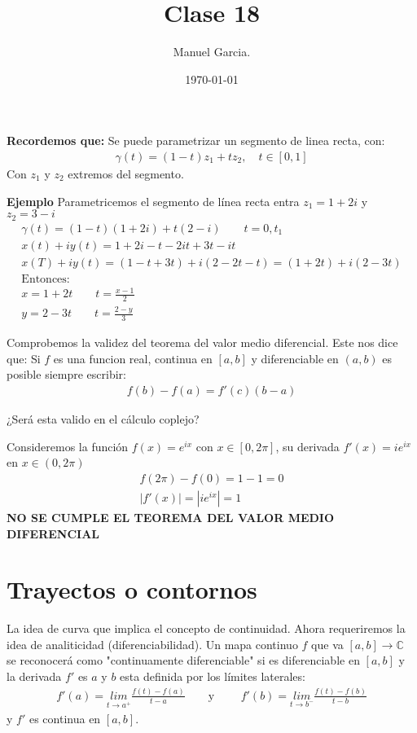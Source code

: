 \documentclass{article}
\title{Clase 18 }
\author{Manuel Garcia.}
\date{\today}
\begin{document}
\maketitle

\section{}
\textbf{Recordemos que: }Se puede parametrizar un segmento de linea recta, con: 
\begin{gather*}
  \gamma(t) = (1-t)z_1 + tz_2, \quad t \in [0,1] 
\end{gather*}
Con $ z_1  $ y $ z_2  $ extremos del segmento. 

\textbf{Ejemplo } Parametricemos el segmento de línea recta entra $ z_1  = 1 + 2 i  $ y $ z_2 = 3 - i  $
\begin{gather*}
  \gamma (t) = (1-t) (1 + 2 i ) + t(2-i ) \qquad t = 0, t_1 \\
  x(t) + i y(t) = 1 + 2 i - t-2it+3t-it\\
  x(T) + i y(t) = (1-t+3t) + i (2 -2t - t) = (1 + 2t) + i (2-3t)\\
  \text{Entonces: }\\
  x = 1+ 2t \qquad t = \frac{x -1 }{ 2 } \\
  y = 2 - 3t \qquad t = \frac{2 - y }{3 }
\end{gather*}

\hfill 

\hfill 

Comprobemos la validez del teorema del valor medio diferencial. Este nos dice que: Si $ f  $ es una funcion real, continua en $ [a,b] $ y diferenciable en $ (a,b) $ es posible siempre escribir: 
\begin{gather*}
  f(b) - f(a) = f'(c)(b-a) 
\end{gather*}

¿Será esta valido en el cálculo coplejo? 

Consideremos la función $ f\left(x\right)=e ^ {i x } $ con $ x \in [0,2\pi ] $, su derivada $ f'(x) = i e ^ {i x } $ en $ x \in (0,2\pi ) $
\begin{gather*}
  f(2\pi ) - f \left(0 \right) = 1 -1 = 0 \\
  \left|f'(x) \right| = \left|i e ^ {ix }\right| = 1
\end{gather*}
\textbf{NO SE CUMPLE EL TEOREMA DEL VALOR MEDIO DIFERENCIAL}

\section{Trayectos o contornos }
La idea de curva que implica el concepto de continuidad. Ahora requeriremos la idea de analiticidad (diferenciabilidad). Un mapa continuo $ f  $ que va $ [a,b] \rightarrow \mathbb{C} $ se reconocerá como "continuamente diferenciable" si es diferenciable en $ [a,b] $ y la derivada $ f'  $ es $ a  $ y $ b  $ esta definida por los límites laterales: 
\begin{gather*}
  f'(a) = \underset{t \rightarrow a ^+ }{lim } \frac{f(t) - f(a) }{t -a } \qquad \text{y } \qquad f'(b) = \underset{t \rightarrow b^- }{lim}\frac{f(t) - f(b) }{t-b } 
\end{gather*}
y $ f' $ es continua en $ [a,b] $.
\end{document}
